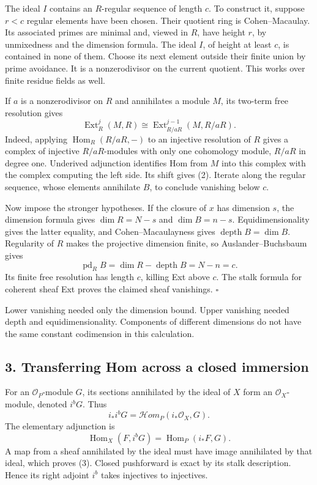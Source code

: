 \documentclass[11pt]{article}
\begin{document}
The ideal \(I\) contains an \(R\)-regular sequence of length \(c\). To
construct it, suppose \(r<c\) regular elements have been chosen. Their
quotient ring is Cohen--Macaulay. Its associated primes are minimal and,
viewed in \(R\), have height \(r\), by unmixedness and the dimension
formula. The ideal \(I\), of height at least \(c\), is contained in none
of them. Choose its next element outside their finite union by prime
avoidance. It is a nonzerodivisor on the current quotient. This works
over finite residue fields as well.

If \(a\) is a nonzerodivisor on \(R\) and annihilates a module \(M\),
its two-term free resolution gives \[
\operatorname{Ext}^j_R(M,R)
 \cong\operatorname{Ext}^{j-1}_{R/aR}(M,R/aR).
\tag{2}
\] Indeed, applying \(\operatorname{Hom}_R(R/aR,-)\) to an injective
resolution of \(R\) gives a complex of injective \(R/aR\)-modules with
only one cohomology module, \(R/aR\) in degree one. Underived adjunction
identifies Hom from \(M\) into this complex with the complex computing
the left side. Its shift gives (2). Iterate along the regular sequence,
whose elements annihilate \(B\), to conclude vanishing below \(c\).

Now impose the stronger hypotheses. If the closure of \(x\) has
dimension \(s\), the dimension formula gives \(\dim R=N-s\) and
\(\dim B=n-s\). Equidimensionality gives the latter equality, and
Cohen--Macaulayness gives \(\operatorname{depth}B=\dim B\). Regularity
of \(R\) makes the projective dimension finite, so Auslander--Buchsbaum
gives \[
\operatorname{pd}_R B=\dim R-\operatorname{depth}B=N-n=c.
\] Its finite free resolution has length \(c\), killing Ext above \(c\).
The stalk formula for coherent sheaf Ext proves the claimed sheaf
vanishings. \(\square\)

Lower vanishing needed only the dimension bound. Upper vanishing needed
depth and equidimensionality. Components of different dimensions do not
have the same constant codimension in this calculation.

\subsection{3. Transferring Hom across a closed
immersion}\label{transferring-hom-across-a-closed-immersion}

For an \(\mathcal O_P\)-module \(G\), its sections annihilated by the
ideal of \(X\) form an \(\mathcal O_X\)-module, denoted \(i^bG\). Thus
\[
i_*i^bG=\mathcal H om_P(i_*\mathcal O_X,G).
\] The elementary adjunction is \[
\operatorname{Hom}_X(F,i^bG)
 =\operatorname{Hom}_P(i_*F,G).
\tag{3}
\] A map from a sheaf annihilated by the ideal must have image
annihilated by that ideal, which proves (3). Closed pushforward is exact
by its stalk description. Hence its right adjoint \(i^b\) takes
injectives to injectives.
\end{document}
